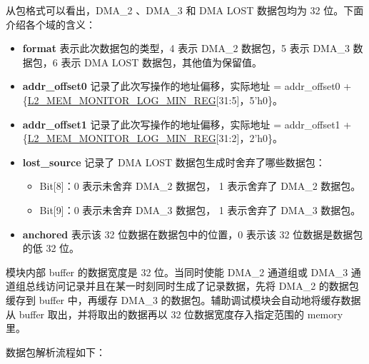 \documentclass[main\_\_CN.tex]{subfiles}
\begin{document}
从包格式可以看出，DMA\_2 、DMA\_3 和 DMA LOST 数据包均为 32 位。下面介绍各个域的含义：
\begin{itemize}
    \item {\bfseries format} 表示此次数据包的类型，4 表示 DMA\_2 数据包，5 表示 DMA\_3 数据包，6 表示 DMA LOST 数据包，其他值为保留值。
    \item {\bfseries addr\_offset0} 记录了此次写操作的地址偏移，实际地址 = addr\_offset0 + \{\hyperref[regdesc:L2MEMMONITORLOGMINREG]{L2\_MEM\_MONITOR\_LOG\_MIN\_REG}[31:5]，5'h0\}。
    \item {\bfseries addr\_offset1} 记录了此次写操作的地址偏移，实际地址 = addr\_offset1 + \{\hyperref[regdesc:L2MEMMONITORLOGMINREG]{L2\_MEM\_MONITOR\_LOG\_MIN\_REG}[31:2]，2'h0\}。
    \item {\bfseries lost\_source} 记录了 DMA LOST 数据包生成时舍弃了哪些数据包：
    \begin{itemize}
        \item Bit[8]：0 表示未舍弃 DMA\_2 数据包， 1 表示舍弃了 DMA\_2 数据包。
        \item Bit[9]：0 表示未舍弃 DMA\_3 数据包， 1 表示舍弃了 DMA\_3 数据包。
    \end{itemize}
    \item {\bfseries anchored} 表示该 32 位数据在数据包中的位置，0 表示该 32 位数据是数据包的低 32 位。
\end{itemize}

模块内部 buffer 的数据宽度是 32 位。当同时使能 DMA\_2 通道组或 DMA\_3 通道组总线访问记录并且在某一时刻同时生成了记录数据，先将 DMA\_2 的数据包缓存到 buffer 中，再缓存 DMA\_3 的数据包。辅助调试模块会自动地将缓存数据从 buffer 取出，并将取出的数据再以 32 位数据宽度存入指定范围的 memory 里。

数据包解析流程如下：
\end{document}
